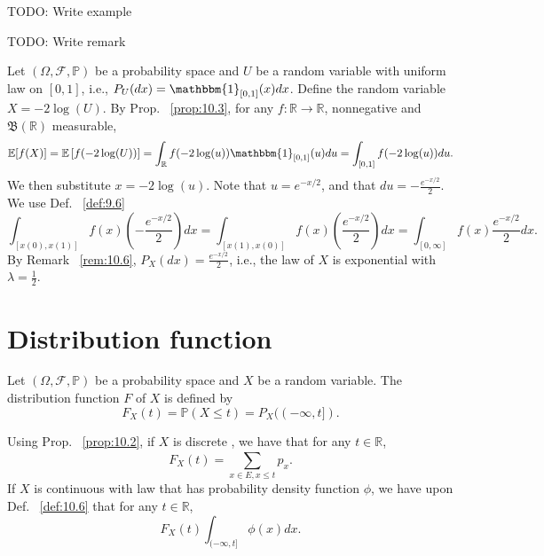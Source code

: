\begin{example}[]
    \label{ex:10.13}
    TODO: Write example
\end{example}

\begin{remark}[]
    \label{rem:10.6}
    TODO: Write remark
\end{remark}

\begin{example}[]
    \label{ex:10.20}
    Let $(\Omega, \mathcal{F}, \mathbb{P})$ be a probability space and $U $ be a random variable with
    uniform law on $\left[ 0,1 \right]  $, i.e., $P_U(dx) = \mathbbm{1}_{\left[ 0,1 \right] }(x) dx $. 
    Define the random variable $X = -2\log(U) $. By Prop. ~\ref{prop:10.3}, for any $f: \mathbb{R} \to \mathbb{R} $,
    nonnegative and $\mathfrak{B}(\mathbb{R}) $ measurable,
    \[
      \mathbb{E}[f(X)] = \mathbb{E}\left[ f(-2\log(U)) \right] 
      = \int_{\mathbb{R}} f(-2\log(u))\mathbbm{1}_{\left[ 0,1 \right] }(u) du 
      = \int_{\left[ 0,1 \right] } f(-2\log(u))du
    .\] 
    We then substitute $x = -2\log(u)$. Note that $u = e^{-x / 2} $, and that
    $du = - \frac{e^{-x/2}}{2} $. We use Def. ~\ref{def:9.6}
    \[
    \int_{\left[ x(0), x(1) \right] } f(x)\left(-\frac{e^{-x / 2}}{2} \right) dx
    = \int_{\left[ x(1), x(0) \right] } f(x)\left(\frac{e^{-x / 2}}{2} \right) dx
    = \int_{\left[ 0, \infty \right] } f(x) \frac{e^{-x / 2}}{2} dx
    .\] 
    By Remark ~\ref{rem:10.6}, $P_X(dx) = \frac{e^{-x /2}}{2} $, i.e., the law of $X $
    is exponential with  $\lambda = \frac{1}{2} $.
\end{example}

\section{Distribution function}%
\label{sec:Distribution function}

\begin{definition}[]
    \label{def:10.10}
    Let $(\Omega, \mathcal{F}, \mathbb{P})$ be a probability space and $X$ be a random variable. The distribution
    function $F$ of $X$ is defined by
    \[
        F_X(t) = \mathbb{P}(X \le t) = P_X((-\infty, t])
    .\] 
    
    \begin{remark}[]
        \label{rem:10.7}
        Using Prop. ~\ref{prop:10.2}, if $X$ is discrete , we have that for any $t \in \mathbb{R}$,
        \[
        F_X(t)=\sum_{x\in E, x\le t}^{ } p_x
        .\] 
        If $X$ is continuous with law that has probability density function $\phi$, we have upon Def.
        ~\ref{def:10.6} that for any $t \in \mathbb{R}$,
        \[
            F_X(t) \int_{(-\infty, t]} \phi(x)dx
        .\] 
    \end{remark}
\end{definition}




